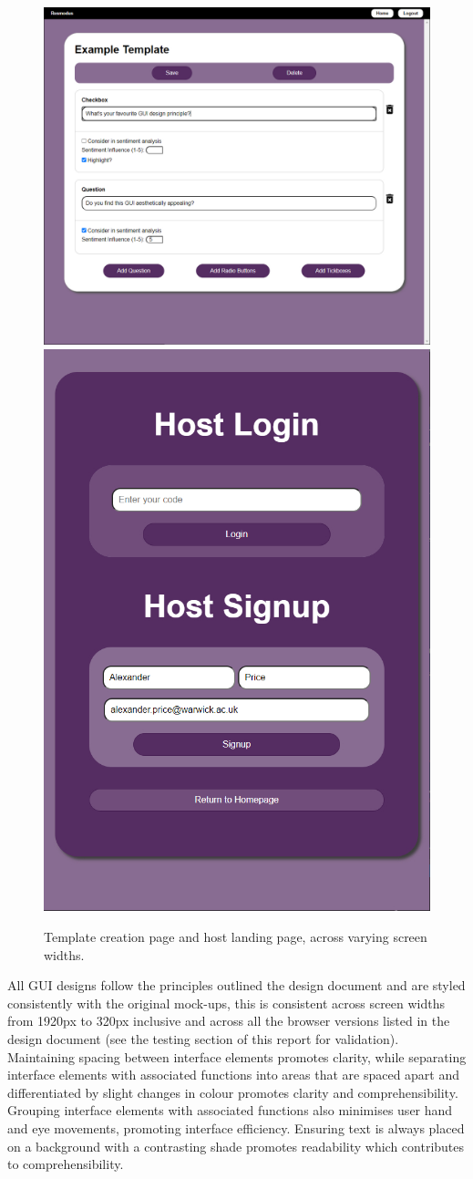\documentclass[9pt, titlepage]{extarticle}
\begin{document}
\begin{figure}[H]
    \centering
  \includegraphics[width=.6\linewidth]{images/Template_Medium.jpg}\hfill
  \includegraphics[width=.36\linewidth]{images/Host_Signup_Thin.jpg}\hfill
  \caption{Template creation page and host landing page, across varying screen widths.}
  \label{fig:gui1}
\end{figure}


All GUI designs follow the principles outlined the design document \cite{design-and-planning} and are styled consistently with the original mock-ups, this is consistent across screen widths from 1920px to 320px inclusive and across all the browser versions listed in the design document (see the testing section of this report for validation).\\

Maintaining spacing between interface elements promotes clarity, while separating interface elements with associated functions into areas that are spaced apart and differentiated by slight changes in colour promotes clarity and comprehensibility. Grouping interface elements with associated functions also minimises user hand and eye movements, promoting interface efficiency. Ensuring text is always placed on a background with a contrasting shade promotes readability which contributes to comprehensibility. \\
\end{document}
